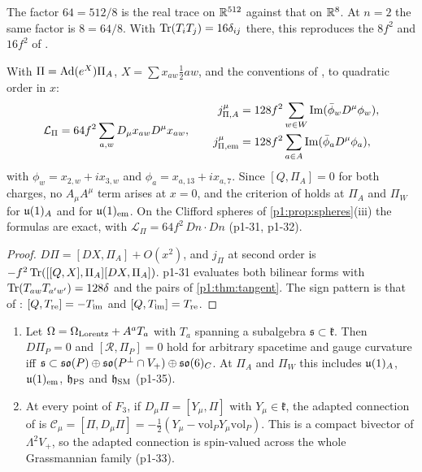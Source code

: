 The factor $64=512/8$ is the real trace on $\R^{512}$ against that on $\R^8$. At $n=2$ the same factor is $8=64/8$. With $\Tr(T_iT_j)=16\delta_{ij}$ there, this reproduces
the $8f^2$ and $16f^2$ of \cite[Thm.~26.7]{ES17}.

\begin{theorem}
\label{p1:thm:kinetic}
With $\Pi=\Ad(e^X)\Pi_A$, $X=\sum x_{aw}\tfrac12aw$, and the conventions of \cite[Thm.~26.7]{ES17}, to quadratic order in $x$:
\[
\mathcal L_\Pi=64f^2\sum_{a,w}D_\mu x_{aw}D^\mu x_{aw},\qquad
\begin{aligned}
j^\mu_{\Pi,A}&=128f^2\sum_{w\in W}\Im(\bar\phi_wD^\mu\phi_w),\\
j^\mu_{\Pi,\rm em}&=128f^2\sum_{a\in A}\Im(\bar\phi_aD^\mu\phi_a),
\end{aligned}
\]
with $\phi_w=x_{2,w}+ix_{3,w}$ and $\phi_a=x_{a,13}+ix_{a,7}$. Since $[Q,\Pi_A]=0$ for both charges, no $A_\mu A^\mu$ term arises at $x=0$, and the criterion of
\cite[Cor.~26.2]{ES17} holds at $\Pi_A$ and $\Pi_W$ for $\uu1_A$ and for $\uu1_{\rm em}$. On the Clifford spheres of \cref{p1:prop:spheres}(iii) the formulas are exact,
with $\mathcal L_\Pi=64f^2\,Dn\cdot Dn$ (p1-31, p1-32).
\end{theorem}

\begin{proof}
$D\Pi=[DX,\Pi_A]+O(x^2)$, and $j_\Pi$ at second order is $-f^2\Tr([[Q,X],\Pi_A][DX,\Pi_A])$. p1-31 evaluates both bilinear forms with $\Tr(T_{aw}T_{a'w'})=128\delta$ and the
pairs of \cref{p1:thm:tangent}. The sign pattern is that of \cite[Thm.~26.7]{ES17}: $[Q,T_{\rm re}]=-T_{\rm im}$ and $[Q,T_{\rm im}]=T_{\rm re}$.
\end{proof}

\begin{theorem}
\label{p1:thm:curved}
\begin{enumerate}[label=(\roman*),leftmargin=2.2em]
\item Let $\Omega=\Omega_{\rm Lorentz}+A^aT_a$ with $T_a$ spanning a subalgebra $\mathfrak s\subset\mathfrak k$. Then $D\Pi_P=0$ and $[\mathcal R,\Pi_P]=0$ hold for arbitrary spacetime and
gauge curvature iff $\mathfrak s\subset\so P\oplus\so{P^\perp\cap V_+}\oplus\so6_C$. At $\Pi_A$ and $\Pi_W$ this includes $\uu1_A$, $\uu1_{\rm em}$, $\mathfrak h_{\rm PS}$ and
$\mathfrak h_{\rm SM}$ (p1-35).
\item At every point of $F_3$, if $D_\mu\Pi=[Y_\mu,\Pi]$ with $Y_\mu\in\mathfrak k$, the adapted connection of \cite[Prop.~25.2]{ES17} is
$\mathcal C_\mu=[\Pi,D_\mu\Pi]=-\tfrac12(Y_\mu-\mathrm{vol}_PY_\mu\mathrm{vol}_P)$. This is a compact bivector of $\Lambda^2V_+$, so the adapted connection is spin-valued across
the whole Grassmannian family (p1-33).
\end{enumerate}
\end{theorem}

